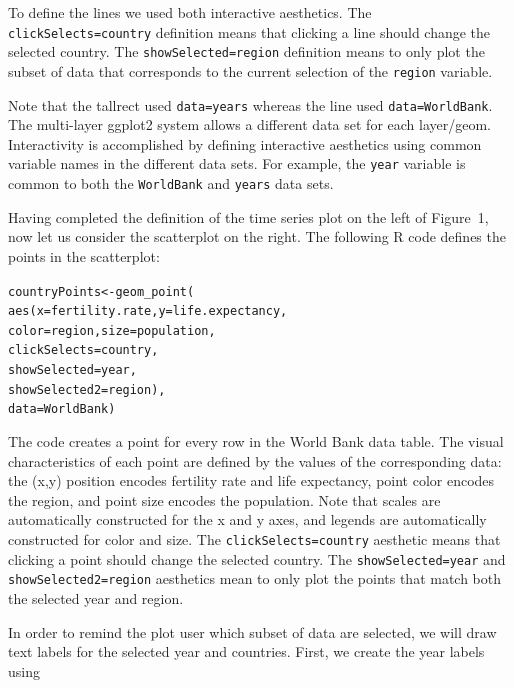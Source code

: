 \documentclass[journal]{vgtc}\usepackage[]{graphicx}\usepackage[]{color}
\makeatletter
\newcommand{\hlstd}[1]{\textcolor[rgb]{0,0,0}{#1}}%
\newcommand{\hlkwb}[1]{\textcolor[rgb]{0,0,0}{#1}}%
\newcommand{\hlkwc}[1]{\textcolor[rgb]{0,0,1}{#1}}%
\newcommand{\hlkwd}[1]{\textcolor[rgb]{0,0,0}{#1}}%
\newenvironment{kframe}{%
 \def\at@end@of@kframe{}%
 \ifinner\ifhmode%
  \def\at@end@of@kframe{\end{minipage}}%
  \begin{minipage}{\columnwidth}%
 \fi\fi%
 \def\FrameCommand##1{\hskip\@totalleftmargin \hskip-\fboxsep
 \colorbox{shadecolor}{##1}\hskip-\fboxsep
     \hskip-\linewidth \hskip-\@totalleftmargin \hskip\columnwidth}%
 \MakeFramed {\advance\hsize-\width
   \@totalleftmargin\z@ \linewidth\hsize
   \@setminipage}}%
 {\par\unskip\endMakeFramed%
 \at@end@of@kframe}
\newenvironment{knitrout}{}{} %
\makeatother
\begin{document}
To define the lines we used both interactive aesthetics. The
\texttt{clickSelects=country} definition means that clicking a line
should change the selected country. The \texttt{showSelected=region}
definition means to only plot the subset of data that corresponds to
the current selection of the \texttt{region} variable.

Note that the tallrect used \texttt{data=years} whereas the line used
\texttt{data=WorldBank}. The multi-layer ggplot2 system allows a
different data set for each layer/geom. Interactivity is accomplished
by defining interactive aesthetics using common variable names in the
different data sets. For example, the \texttt{year} variable is common
to both the \texttt{WorldBank} and \texttt{years} data sets.

Having completed the definition of the time series plot on the left of
Figure~1, now let us consider the scatterplot on the right. The
following R code defines the points in the scatterplot:

\begin{knitrout}
\color{fgcolor}\begin{kframe}
\begin{alltt}
\hlstd{countryPoints} \hlkwb{<-} \hlkwd{geom_point}\hlstd{(}
    \hlkwd{aes}\hlstd{(}\hlkwc{x}\hlstd{=fertility.rate,} \hlkwc{y}\hlstd{=life.expectancy,}
        \hlkwc{color}\hlstd{=region,} \hlkwc{size}\hlstd{=population,}
        \hlkwc{clickSelects}\hlstd{=country,}
        \hlkwc{showSelected}\hlstd{=year,}
        \hlkwc{showSelected2}\hlstd{=region),}
    \hlkwc{data}\hlstd{=WorldBank)}
\end{alltt}
\end{kframe}
\end{knitrout}

The code creates a point for every row in the World Bank data
table. The visual characteristics of each point are defined by the
values of the corresponding data: the (x,y) position encodes fertility
rate and life expectancy, point color encodes the region, and point
size encodes the population. Note that scales are automatically
constructed for the x and y axes, and legends are automatically
constructed for color and size. The \texttt{clickSelects=country}
aesthetic means that clicking a point should change the selected
country. The \texttt{showSelected=year} and
\texttt{showSelected2=region} aesthetics mean to only plot the points
that match both the selected year and region.

In order to remind the plot user which subset of data are selected, we
will draw text labels for the selected year and countries. First, we
create the year labels using
\end{document}
